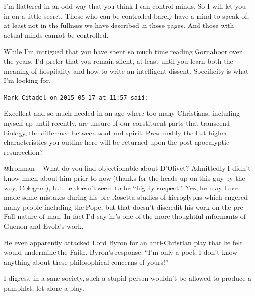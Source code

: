 \begin{footnotesize}
\begin{sffamily}
I'm flattered in an odd way that you think I can control minds. So I will let you in on a little secret. Those who can be controlled barely have a mind to speak of, at least not in the fullness we have described in these pages. And those with actual minds cannot be controlled.

While I'm intrigued that you have spent so much time reading Gornahoor over the years, I'd prefer that you remain silent, at least until you learn both the meaning of hospitality and how to write an intelligent dissent. Specificity is what I'm looking for.

\hfill

\texttt{Mark Citadel on 2015-05-17 at 11:57 said:}

Excellent and so much needed in an age where too many Christians, including myself up until recently, are unsure of our constituent parts that transcend biology, the difference between soul and spirit. Presumably the lost higher characteristics you outline here will be returned upon the post-apocalyptic resurrection?

@Ironman -- What do you find objectionable about D'Olivet? Admittedly I didn't know much about him prior to now (thanks for the heads up on this guy by the way, Cologero), but he doesn't seem to be ``highly suspect''. Yes, he may have made some mistakes during his pre-Rosetta studies of hieroglyphs which angered many people including the Pope, but that doesn't discredit his work on the pre-Fall nature of man. In fact I'd say he's one of the more thoughtful informants of Guenon and Evola's work.

He even apparently attacked Lord Byron for an anti-Christian play that he felt would undermine the Faith. Byron's response: ``I'm only a poet; I don't know anything about these philosophical concerns of yours!''

I digress, in a sane society, such a stupid person wouldn't be allowed to produce a pamphlet, let alone a play.

\end{sffamily}
\end{footnotesize}

